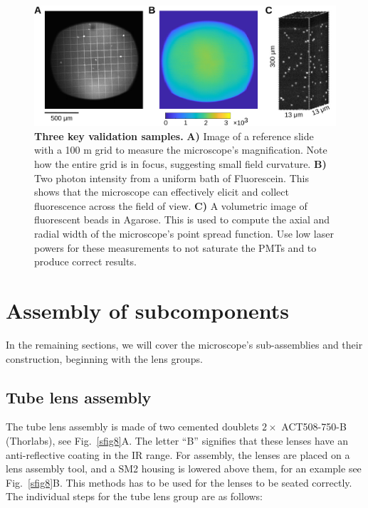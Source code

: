 \documentclass[10pt,letterpaper]{article}
\begin{document}
%
\begin{figure}[!t]
    \includegraphics[width=\textwidth]{sfig7.jpg}
    \caption{{\bf Three key validation samples.} \textbf{A)} Image of a reference slide with a 100 \textmu m grid to measure the microscope's magnification. Note how the entire grid is in focus, suggesting small field curvature. \textbf{B)} Two photon intensity from a uniform bath of Fluorescein. This shows that the microscope can effectively elicit and collect fluorescence across the field of view. \textbf{C)} A volumetric image of fluorescent beads in Agarose. This is used to compute the axial and radial width of the microscope's point spread function. Use low laser powers for these measurements to not saturate the PMTs and to produce correct results.}
    \label{sfig7}
\end{figure}
%
%
\section{Assembly of subcomponents}
In the remaining sections, we will cover the microscope's sub-assemblies and their construction, beginning with the lens groups.
%
\subsection{Tube lens assembly}
The tube lens assembly is made of two cemented doublets $2\times$ ACT508-750-B (Thorlabs), see Fig.~\ref{sfig8}A. The letter ``B'' signifies that these lenses have an anti-reflective coating in the IR range. For assembly, the lenses are placed on a lens assembly tool, and a SM2 housing is lowered above them, for an example see Fig.~\ref{sfig8}B. This methods has to be used for the lenses to be seated correctly. The individual steps for the tube lens group are as follows:
\end{document}
